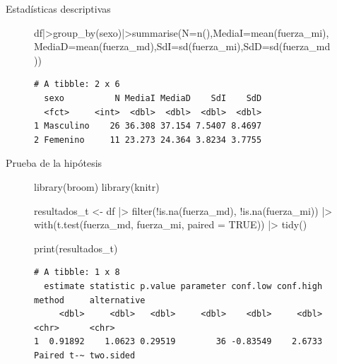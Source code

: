 \documentclass[
  ignorenonframetext,
]{beamer}
\newenvironment{Shaded}{\begin{snugshade}}{\end{snugshade}}
\newcommand{\AttributeTok}[1]{\textcolor[rgb]{0.40,0.45,0.13}{#1}}
\newcommand{\ConstantTok}[1]{\textcolor[rgb]{0.56,0.35,0.01}{#1}}
\newcommand{\FunctionTok}[1]{\textcolor[rgb]{0.28,0.35,0.67}{#1}}
\newcommand{\NormalTok}[1]{\textcolor[rgb]{0.00,0.23,0.31}{#1}}
\newcommand{\OtherTok}[1]{\textcolor[rgb]{0.00,0.23,0.31}{#1}}
\newcommand{\SpecialCharTok}[1]{\textcolor[rgb]{0.37,0.37,0.37}{#1}}
\begin{document}
\begin{frame}[fragile]{Estadísticas descriptivas}
\label{estaduxedsticas-descriptivas}
\begin{figure}

\begin{Shaded}
\begin{Highlighting}[]
\NormalTok{df}\SpecialCharTok{|\textgreater{}}\FunctionTok{group\_by}\NormalTok{(sexo)}\SpecialCharTok{|\textgreater{}}\FunctionTok{summarise}\NormalTok{(}\AttributeTok{N=}\FunctionTok{n}\NormalTok{(),}\AttributeTok{MediaI=}\FunctionTok{mean}\NormalTok{(fuerza\_mi),}\AttributeTok{MediaD=}\FunctionTok{mean}\NormalTok{(fuerza\_md),}\AttributeTok{SdI=}\FunctionTok{sd}\NormalTok{(fuerza\_mi),}\AttributeTok{SdD=}\FunctionTok{sd}\NormalTok{(fuerza\_md))  }
\end{Highlighting}
\end{Shaded}

\begin{verbatim}
# A tibble: 2 x 6
  sexo          N MediaI MediaD    SdI    SdD
  <fct>     <int>  <dbl>  <dbl>  <dbl>  <dbl>
1 Masculino    26 36.308 37.154 7.5407 8.4697
2 Femenino     11 23.273 24.364 3.8234 3.7755
\end{verbatim}

\end{figure}%
\end{frame}

\begin{frame}[fragile]{Prueba de la hipótesis}
\label{prueba-de-la-hipuxf3tesis-2}
\begin{figure}

\begin{Shaded}
\begin{Highlighting}[]
\FunctionTok{library}\NormalTok{(broom)}
\FunctionTok{library}\NormalTok{(knitr) }

\NormalTok{resultados\_t }\OtherTok{\textless{}{-}}\NormalTok{ df }\SpecialCharTok{|\textgreater{}}
  \FunctionTok{filter}\NormalTok{(}\SpecialCharTok{!}\FunctionTok{is.na}\NormalTok{(fuerza\_md), }\SpecialCharTok{!}\FunctionTok{is.na}\NormalTok{(fuerza\_mi)) }\SpecialCharTok{|\textgreater{}}
  \FunctionTok{with}\NormalTok{(}\FunctionTok{t.test}\NormalTok{(fuerza\_md, fuerza\_mi, }\AttributeTok{paired =} \ConstantTok{TRUE}\NormalTok{)) }\SpecialCharTok{|\textgreater{}}
  \FunctionTok{tidy}\NormalTok{()}

\FunctionTok{print}\NormalTok{(resultados\_t)}
\end{Highlighting}
\end{Shaded}

\begin{verbatim}
# A tibble: 1 x 8
  estimate statistic p.value parameter conf.low conf.high method     alternative
     <dbl>     <dbl>   <dbl>     <dbl>    <dbl>     <dbl> <chr>      <chr>      
1  0.91892    1.0623 0.29519        36 -0.83549    2.6733 Paired t-~ two.sided  
\end{verbatim}

\end{figure}%
\end{frame}
\end{document}
